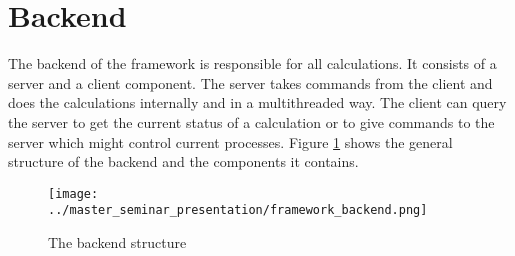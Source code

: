 
	\section{Backend}
	The backend of the framework is responsible for all calculations. It consists of a server and a client component. The server takes commands from the client and does the calculations internally and in a multithreaded way. The client can query the server to get the current status of a calculation or to give commands to the server which might control current processes. Figure \ref{fig_backend} shows the general structure of the backend and the components it contains.
	
\begin{figure}[hbtp]
\caption{The backend structure}
\label{fig_backend}
\centering
\texttt{[image: ../master\_seminar\_presentation/framework\_backend.png]}
\end{figure}